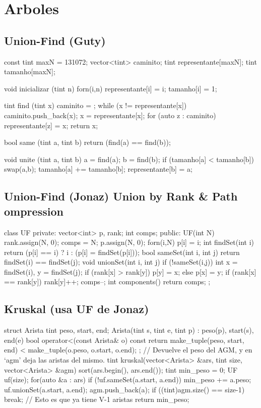 \section{Arboles}

\subsection{Union-Find (Guty)}
\begin{code}
const tint maxN = 131072;
vector<tint> caminito;
tint representante[maxN];
tint tamanho[maxN];

void inicializar (tint n)
{
	forn(i,n)
	{
		representante[i] = i;
		tamanho[i] = 1;
	}
}

tint find (tint x)
{
	caminito = {};
	while (x != representante[x])
	{
		caminito.push_back(x);
		x = representante[x];	
	}
	for (auto z : caminito)
		representante[z] = x;
	return x;
}

bool same (tint a, tint b)
{
	return (find(a) == find(b));
}

void unite (tint a, tint b)
{
	a = find(a);
	b = find(b);
	if (tamanho[a] < tamanho[b])
		swap(a,b);
	tamanho[a] += tamanho[b];
	representante[b] = a;	
}
\end{code}

\subsection{Union-Find (Jonaz) Union by Rank \& Path ompression}
\begin{code}
class UF {
private: vector<int> p, rank; int comps;
public: 
  UF(int N) {
    rank.assign(N, 0); comps = N;
    p.assign(N, 0); forn(i,N) p[i] = i;
  }
  int findSet(int i) { return (p[i] == i) ? i : (p[i] = findSet(p[i])); }
  bool sameSet(int i, int j) { return findSet(i) == findSet(j); }
  void unionSet(int i, int j) {
    if (!sameSet(i,j)) {
      int x = findSet(i), y = findSet(j);
      if (rank[x] > rank[y]) p[y] = x;
      else { 
        p[x] = y; 
        if (rank[x] == rank[y]) rank[y]++;
      }
      comps--;
    }
  }
  int components() { return comps; }
};
\end{code}

\subsection{Kruskal (usa UF de Jonaz)}
\begin{code}
struct Arista {
  tint peso, start, end;
  Arista(tint s, tint e, tint p) : peso(p), start(s), end(e) {}
  bool operator<(const Arista& o) const {
    return make_tuple(peso, start, end) < make_tuple(o.peso, o.start, o.end);
}};
// Devuelve el peso del AGM, y en `agm' deja las aristas del mismo. 
tint kruskal(vector<Arista> &ars, tint size, vector<Arista> &agm) {
  sort(ars.begin(), ars.end());
  tint min_peso = 0;
  UF uf(size);
  for(auto &a : ars) {
    if (!uf.sameSet(a.start, a.end)) {
      min_peso += a.peso;
      uf.unionSet(a.start, a.end);
      agm.push_back(a);
      if ((tint)agm.size() == size-1) break; // Esto es que ya tiene V-1 aristas
  }}
  return min_peso;
}
\end{code}


